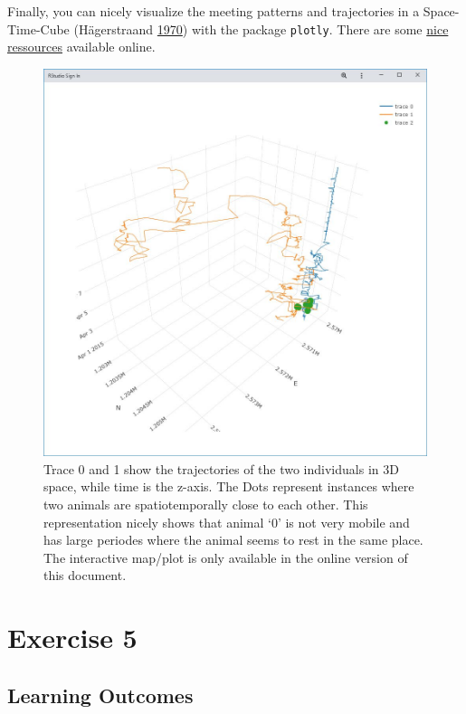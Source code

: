 \documentclass[]{book}
\begin{document}
Finally, you can nicely visualize the meeting patterns and trajectories in a Space-Time-Cube (Hägerstraand \protect\hyperlink{ref-hagerstraand1970}{1970}) with the package \texttt{plotly}. There are some \href{https://plot.ly/r/3d-line-plots/}{nice ressources} available online.

\begin{figure}
\centering
\includegraphics{02_Images/w04_ex1_p1.jpg}
\caption{Trace 0 and 1 show the trajectories of the two individuals in 3D space, while time is the z-axis. The Dots represent instances where two animals are spatiotemporally close to each other. This representation nicely shows that animal `0' is not very mobile and has large periodes where the animal seems to rest in the same place. The interactive map/plot is only available in the online version of this document.}
\end{figure}

\hypertarget{exercise-5}{%
\chapter{Exercise 5}\label{exercise-5}}

\hypertarget{learning-outcomes-3}{%
\section{Learning Outcomes}\label{learning-outcomes-3}}
\end{document}
